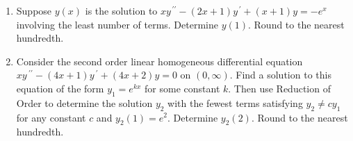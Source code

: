 \documentclass{ximera}
\begin{document}
\begin{enumerate}[label=(\arabic*)]
\begin{enumerate}[label=(\alph*)]
\item  $z^{\,\prime}+\dfrac{z}{x} = -1$
\item  $z^{\,\prime}-\dfrac{z}{x} = -\dfrac{1}{x}$  %
\item  $z^{\,\prime} +(2-2xe^{-x}-e^{-x})z=-1$ 
\item  $z^{\,\prime} -2e^x z =-\dfrac{1}{x}$ 
\item  $z^{\,\prime} +2e^x z =-\dfrac{1}{x}$ 
\item  $z^{\,\prime} - 2xe^x z =-e^x$ \\
\end{enumerate}

    
    
    
    


\newpage

\item Suppose $y(x)$ is the solution to $xy^{\,\prime\prime}-(2x+1)y^{\,\prime}+(x+1)y=-e^x$ involving the least number of terms.  Determine $y(1)$.  Round to the nearest hundredth.  






\item Consider the second order linear homogeneous differential equation \\$xy\,^{\prime\prime}-(4x+1)y\,^{\prime}+(4x+2)y=0$ on $(0,\infty)$.  Find a solution to this equation of the form $y_1=e^{kx}$ for some constant $k$. Then use Reduction of Order to determine the solution $y_2$ with the fewest terms satisfying $y_2\neq cy_1$ for any constant $c$ and $y_2(1)=e^2$. Determine $y_2(2)$.  Round to the nearest hundredth.




\end{enumerate}
\end{document}
